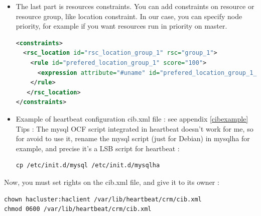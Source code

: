 \documentclass[a4paper,10pt]{report}
\begin{document}
\begin{itemize}
\begin{itemize}
\end{itemize}

\item The last part is resources constraints. You can add constraints on resource or resource group, like location constraint.
In our case, you can specify node priority, for example if you want resources run in priority on master.
\begin{lstlisting}[language=xml]
<constraints>
  <rsc_location id="rsc_location_group_1" rsc="group_1">
    <rule id="prefered_location_group_1" score="100">
      <expression attribute="#uname" id="prefered_location_group_1_expr" operation="eq" value="NODE-NAME"/>
    </rule>
   </rsc_location>
</constraints>
\end{lstlisting}

\item Example of heartbeat configuration cib.xml file : see appendix \ref{cibexample}\\

Tips : The mysql OCF script integrated in heartbeat doesn't work for me, so for avoid to use it, rename the mysql script (just for Debian) in mysqlha for example, and precise it's a LSB script for heartbeat :
\begin{lstlisting}
cp /etc/init.d/mysql /etc/init.d/mysqlha
\end{lstlisting}


\end{itemize}

Now, you must set rights on the cib.xml file, and give it to its owner :
\begin{lstlisting}
chown hacluster:haclient /var/lib/heartbeat/crm/cib.xml
chmod 0600 /var/lib/heartbeat/crm/cib.xml
\end{lstlisting}
\end{document}
